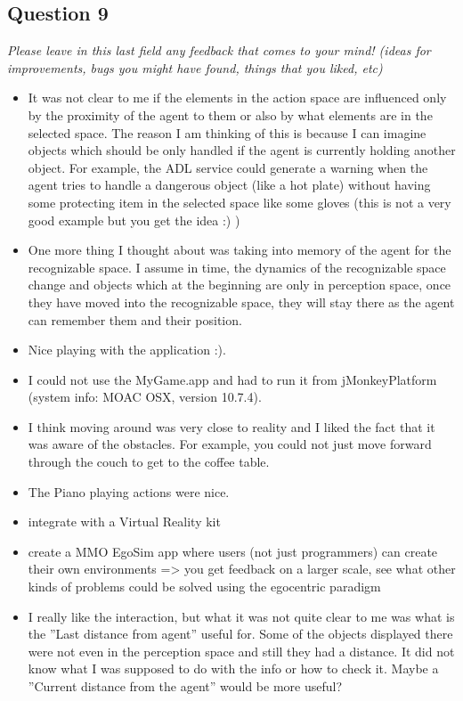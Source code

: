 \subsection{Question 9}\label{question1:9}
\emph{Please leave in this last field any feedback that comes to your mind! (ideas for improvements, bugs you might have found, things that you liked, etc)}

\begin{itemize}
	\item It was not clear to me if the elements in the action space are influenced only by the proximity of the agent to them or also by what elements are in the selected space. The reason I am thinking of this is because I can imagine objects which should be only handled if the agent is currently holding another object. For example, the ADL service could generate a warning when the agent tries to handle a dangerous object (like a hot plate) without having some protecting item in the selected space like some gloves (this is not a very good example but you get the idea :) )
	\item One more thing I thought about was taking into memory of the agent for the recognizable space. I assume in time, the dynamics of the recognizable space change and objects which at the beginning are only in perception space, once they have moved into the recognizable space, they will stay there as the agent can remember them and their position.
	\item Nice playing with the application :).
	\item I could not use the MyGame.app and had to run it from jMonkeyPlatform (system info: MOAC OSX, version 10.7.4).
	\item I think moving around was very close to reality and I liked the fact that it was aware of the obstacles. For example, you could not just move forward through the couch to get to the coffee table.
	\item The Piano playing actions were nice.
	\item integrate with a Virtual Reality kit
	\item create a MMO EgoSim app where users (not just programmers) can create their own environments => you get feedback on a larger scale, see what other kinds of problems could be solved using the egocentric paradigm
	\item I really like the interaction, but what it was not quite clear to me was what is the ''Last distance from agent'' useful for. Some of the objects displayed there were not even in the perception space and still they had a distance. It did not know what I was supposed to do with the info or how to check it. Maybe a ''Current distance from the agent'' would be more useful?

\end{itemize}
